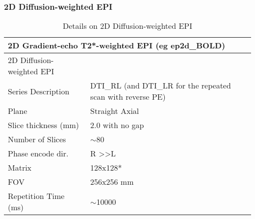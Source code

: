 \documentclass[
	a4paper, 
	11.5pt,
	headings=small, 
	twoside, 
	titlepage=firstiscover, 
 	pagesize=auto,
  	version=last,
	open=any,
	BCOR=14mm,
  	chapterprefix=false]{scrbook}
\begin{document}
\subsubsection{2D Diffusion-weighted EPI}
\begin{table}[H]
\caption{Details on 2D Diffusion-weighted EPI}
\begin{tabularx}{1\textwidth}{@{}X *{1}{X}@{}}
\toprule
\multicolumn{2}{l}{\textbf{2D Gradient-echo T2*-weighted \ac{EPI} (eg ep2d\_BOLD)}} \\
\midrule                                                                                                                                                                                                                                                                                                                                                                                                                                                                                                                                                                                                                                                                                                                          
2D Diffusion-weighted EPI &                                                                                      \\
Series Description        							& \ac{DTI}\_RL (and DTI\_LR for the repeated scan with reverse PE)                          \\
Plane                    						 		& Straight Axial                                                                       \\
Slice thickness (mm)      							& 2.0 with no gap                                                                      \\
Number of Slices          							& $\sim$80                                                                             \\
Phase encode dir.         							& R \textgreater{}\textgreater L                                                       \\
Matrix                    								& 128x128*                                                                             \\
FOV                       								& 256x256 mm                                                                           \\
Repetition Time (ms)      						& $\sim$10000                                                                          \\

\end{tabularx}
\end{table}
\end{document}

